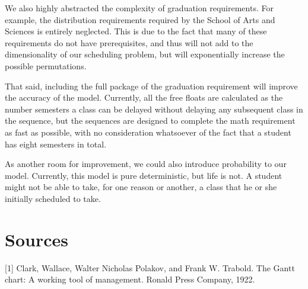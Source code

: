 \documentclass[12pt, oneside]{article}
\begin{document}
\bigskip

We also highly abstracted the complexity of graduation requirements. For example, the distribution requirements required by the School of Arts and Sciences is entirely neglected. This is due to the fact that many of these requirements do not have prerequisites, and thus will not add to the dimensionality of our scheduling problem, but will exponentially increase the possible permutations. 

\bigskip

That said, including the full package of the graduation requirement will improve the accuracy of the model. Currently, all the free floats are calculated as the number semesters a class can be delayed without delaying any subsequent class in the sequence, but the sequences are designed to complete the math requirement as fast as possible, with no consideration whatsoever of the fact that a student has eight semesters in total.

\bigskip

As another room for improvement, we could also introduce probability to our model. Currently, this model is pure deterministic, but life is not. A student might not be able to take, for one reason or another, a class that he or she initially scheduled to take. 
\bigskip

\section{Sources}
[1] Clark, Wallace, Walter Nicholas Polakov, and Frank W. Trabold. The Gantt chart: A working tool of management. Ronald Press Company, 1922.
\end{document}
